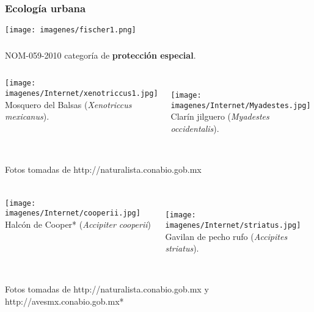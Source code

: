 \documentclass[compress]{beamer}
\begin{document}
{
\begin{frame}
\frametitle{Ecología urbana}
\vspace{-0.5cm}

\begin{center}
\hspace*{-1cm}\texttt{[image: imagenes/fischer1.png]}\\

\end{center}

\end{frame}
}


{
\begin{frame}
\frametitle{}
\begin{itemize}
\normalsize{ \item  NOM-059-2010  categoría de \textbf{protección especial}.}
\end{itemize}
\begin{columns}[t]
\centering
\texttt{[image: imagenes/Internet/xenotriccus1.jpg]}\\
\caption{\tiny{ Mosquero del Balsas (\textit{Xenotriccus mexicanus}).}}\\
\centering
\texttt{[image: imagenes/Internet/Myadestes.jpg]}\\
\caption{\tiny{ Clarín jilguero (\textit{Myadestes occidentalis}).}}
\end{columns}\\[2cm]
\tiny{Fotos tomadas de http://naturalista.conabio.gob.mx }

\end{frame}
}

{
\begin{frame}
\frametitle{}
\begin{columns}[t]
\centering
\texttt{[image: imagenes/Internet/cooperii.jpg]}\\
\caption{\tiny{ Halcón de Cooper* (\textit{Accipiter cooperii})}}\\
\centering
\texttt{[image: imagenes/Internet/striatus.jpg]}\\
\caption{\tiny{ Gavilan de pecho rufo (\textit{Accipites striatus}).}}
\end{columns}\\[2cm]
\tiny{Fotos tomadas de http://naturalista.conabio.gob.mx y http://avesmx.conabio.gob.mx*}

\end{frame}
}
\end{document}
